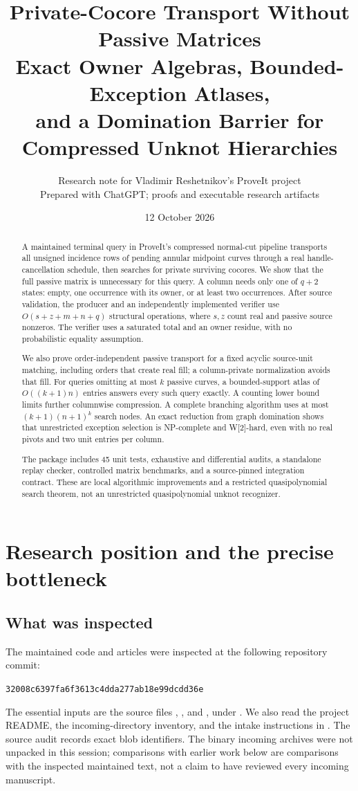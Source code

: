 \documentclass[11pt,letterpaper]{article}
\title{Private-Cocore Transport Without Passive Matrices\\[5pt]
\large Exact Owner Algebras, Bounded-Exception Atlases,\\and a Domination Barrier for Compressed Unknot Hierarchies}
\author{Research note for Vladimir Reshetnikov's ProveIt project\\\small Prepared with ChatGPT; proofs and executable research artifacts}
\date{12 October 2026}
\theoremstyle{definition}
\newcommand{\commit}{\texttt{32008c6397fa6f3613c4dda277ab18e99dcdd36e}}
\begin{document}
\maketitle
\begin{abstract}
A maintained terminal query in ProveIt's compressed normal-cut pipeline transports all unsigned incidence rows of pending annular midpoint curves through a real handle-cancellation schedule, then searches for private surviving cocores. We show that the full passive matrix is unnecessary for this query. A column needs only one of $q+2$ states: empty, one occurrence with its owner, or at least two occurrences. After source validation, the producer and an independently implemented verifier use $O(s+z+m+n+q)$ structural operations, where $s,z$ count real and passive source nonzeros. The verifier uses a saturated total and an owner residue, with no probabilistic equality assumption.

We also prove order-independent passive transport for a fixed acyclic source-unit matching, including orders that create real fill; a column-private normalization avoids that fill. For queries omitting at most $k$ passive curves, a bounded-support atlas of $O((k+1)n)$ entries answers every such query exactly. A counting lower bound limits further columnwise compression. A complete branching algorithm uses at most $(k+1)(n+1)^k$ search nodes. An exact reduction from graph domination shows that unrestricted exception selection is NP-complete and W[2]-hard, even with no real pivots and two unit entries per column.

The package includes 45 unit tests, exhaustive and differential audits, a standalone replay checker, controlled matrix benchmarks, and a source-pinned integration contract. These are local algorithmic improvements and a restricted quasipolynomial search theorem, not an unrestricted quasipolynomial unknot recognizer.
\end{abstract}
\tableofcontents
\newpage

\section{Research position and the precise bottleneck}
\subsection{What was inspected}
The maintained code and articles were inspected at the following repository commit:
\begin{center}\commit\end{center}
The essential inputs are the source files , , and , under . We also read the project README, the incoming-directory inventory, and the intake instructions in . The source audit records exact blob identifiers. The binary incoming archives were not unpacked in this session; comparisons with earlier work below are comparisons with the inspected maintained text, not a claim to have reviewed every incoming manuscript.
\end{document}
